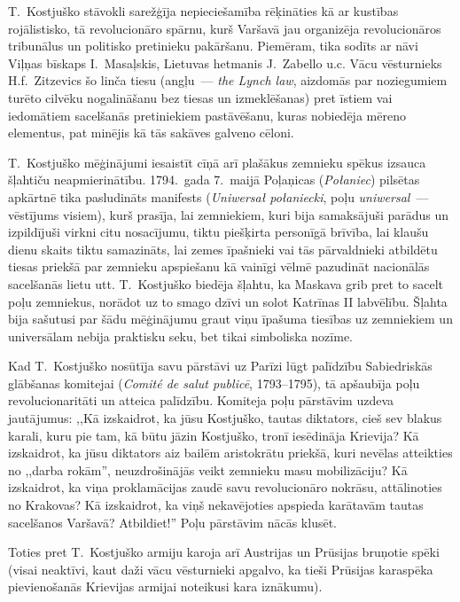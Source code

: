 \documentclass[twoside,a5paper,12pt,fleqn,openany]{extbook}
\newcommand{\pltxti}[1]{\textit{\textpolish{#1}}}
\newcommand{\frtxti}[1]{\textit{\textfrench{#1}}}
\newcommand{\entxti}[1]{\textit{\textenglish{#1}}}
\begin{document}
T.~Kostjuško stāvokli sarežģīja nepieciešamība rēķināties kā ar kustības rojālistisko, tā revolucionāro spārnu, kurš Varšavā jau organizēja revolucionāros tribunālus un politisko pretinieku pakāršanu. Piemēram, tika sodīts ar nāvi Viļņas bīskaps I.~Masaļskis, Lietuvas hetmanis J.~Zabello u.c. Vācu vēsturnieks H.f.~Zitzevics šo linča tiesu (angļu~--- \entxti{the Lynch law}, aizdomās par noziegumiem turēto cilvēku nogalināšanu bez tiesas un izmeklēšanas) pret īstiem vai iedomātiem sacelšanās pretiniekiem pastāvēšanu, kuras nobiedēja mēreno elementus, pat minējis kā tās sakāves galveno cēloni.

T.~Kostjuško mēģinājumi iesaistīt cīņā arī plašākus zemnieku spēkus izsauca šļahtiču neapmierinātību. 1794.~gada 7.~maijā Poļaņicas (\pltxti{Połaniec}) pilsētas apkārtnē tika pasludināts manifests (\pltxti{Uniwersał połaniecki}, poļu \pltxti{uniwersal}~--- vēstījums visiem), kurš prasīja, lai zemniekiem, kuri bija samaksājuši parādus un izpildījuši virkni citu nosacījumu, tiktu piešķirta personīgā brīvība, lai klaušu dienu skaits tiktu samazināts, lai zemes īpašnieki vai tās pārvaldnieki atbildētu tiesas priekšā par zemnieku apspiešanu kā vainīgi vēlmē pazudināt nacionālās sacelšanās lietu utt. T.~Kostjuško biedēja šļahtu, ka Maskava grib pret to sacelt poļu zemniekus, norādot uz to smago dzīvi un solot Katrīnas II labvēlību. Šļahta bija sašutusi par šādu mēģinājumu graut viņu īpašuma tiesības uz zemniekiem un universālam nebija praktisku seku, bet tikai simboliska nozīme.

Kad T.~Kostjuško nosūtīja savu pārstāvi uz Parīzi lūgt palīdzību Sabiedriskās glābšanas komitejai (\frtxti{Comité de salut publicē}, 1793--1795), tā apšaubīja poļu revolucionaritāti un atteica palīdzību. Komiteja poļu pārstāvim uzdeva jautājumus: ,,Kā izskaidrot, ka jūsu Kostjuško, tautas diktators, cieš sev blakus karali, kuru pie tam, kā būtu jāzin Kostjuško, tronī iesēdināja Krievija? Kā izskaidrot, ka jūsu diktators aiz bailēm aristokrātu priekšā, kuri nevēlas atteikties no ,,darba rokām'', neuzdrošinājās veikt zemnieku masu mobilizāciju? Kā izskaidrot, ka viņa proklamācijas zaudē savu revolucionāro nokrāsu, attālinoties no Krakovas? Kā izskaidrot, ka viņš nekavējoties apspieda karātavām tautas sacelšanos Varšavā? Atbildiet!'' Poļu pārstāvim nācās klusēt.

Toties pret T.~Kostjuško armiju karoja arī Austrijas un Prūsijas bruņotie spēki (visai neaktīvi, kaut daži vācu vēsturnieki apgalvo, ka tieši Prūsijas karaspēka pievienošanās Krievijas armijai noteikusi kara iznākumu).
\end{document}
